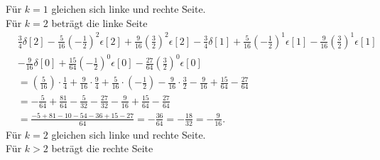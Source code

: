 \documentclass[11pt,a4paper,DIV=12]{scrartcl}
\begin{document}
Für $k=1$ gleichen sich linke und rechte Seite.\\
Für $k=2$ beträgt die linke Seite
\begin{align}
	&\frac{3}{4}\delta[2]-\frac{5}{16}\left(-\frac{1}{2}\right)^2\epsilon[2]+\frac{9}{16}\left(\frac{3}{2}\right)^2\epsilon[2]-\frac{3}{4}\delta[1]+\frac{5}{16}\left(-\frac{1}{2}\right)^{1}\epsilon[1]-\frac{9}{16}\left(\frac{3}{2}\right)^{1}\epsilon[1]\nonumber \\
	&-\frac{9}{16}\delta[0]+\frac{15}{64}\left(-\frac{1}{2}\right)^{0}\epsilon[0]-\frac{27}{64}\left(\frac{3}{2}\right)^{0}\epsilon[0]\nonumber\\
	&=\left(\frac{5}{16}\right)\cdot\frac{1}{4}+\frac{9}{16}\cdot\frac{9}{4}+\frac{5}{16}\cdot\left(-\frac{1}{2}\right)-\frac{9}{16}\cdot\frac{3}{2}-\frac{9}{16}+\frac{15}{64}-\frac{27}{64}\nonumber\\
	&=-\frac{5}{64}+\frac{81}{64}-\frac{5}{32}-\frac{27}{32}-\frac{9}{16}+\frac{15}{64}-\frac{27}{64}\nonumber\\
	&=\frac{-5+81-10-54-36+15-27}{64}=-\frac{36}{64}=-\frac{18}{32}=-\frac{9}{16}.
\end{align}
Für $k=2$ gleichen sich linke und rechte Seite.\\
Für $k>2$ beträgt die rechte Seite
\end{document}
